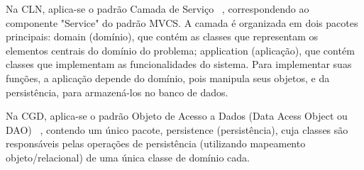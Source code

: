 Na CLN, aplica-se o padrão Camada de Serviço ~\cite{fowler:book02}, correspondendo ao componente "Service" do padrão MVCS. A camada é organizada em dois pacotes principais: \textsf{domain} (domínio), que contém as classes que representam os elementos centrais do domínio do problema; \textsf{application} (aplicação), que contém classes que implementam as funcionalidades do sistema. Para implementar suas funções, a aplicação depende do domínio, pois manipula seus objetos, e da persistência, para armazená-los no banco de dados.

Na CGD, aplica-se o padrão Objeto de Acesso a Dados (Data Acess Object ou DAO) ~\cite{bauer:hibernate06}, contendo um único pacote, \textsf{persistence} (persistência), cuja classes são responsáveis pelas operações de persistência (utilizando mapeamento objeto/relacional) de uma única classe de domínio cada. 

